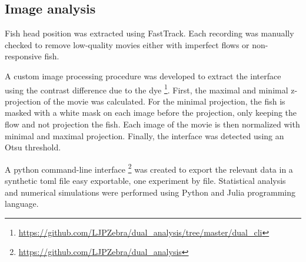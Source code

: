 \begin{appendices}
    \section{Image analysis}
     \label{auto_analysis}
    Fish head position was extracted using FastTrack. Each recording was manually checked to remove low-quality movies either with imperfect flows or non-responsive fish.

    A custom image processing procedure was developed to extract the interface using the contrast difference due to the dye \footnote{\url{https://github.com/LJPZebra/dual_analysis/tree/master/dual_cli}}. First, the maximal and minimal z-projection of the movie was calculated. For the minimal projection, the fish is masked with a white mask on each image before the projection, only keeping the flow and not projection the fish. Each image of the movie is then normalized with minimal and maximal projection. Finally, the interface was detected using an Otsu threshold.

    A python command-line interface \footnote{\url{https://github.com/LJPZebra/dual_analysis}} was created to export the relevant data in a synthetic toml file easy exportable, one experiment by file. Statistical analysis and numerical simulations were performed using Python and Julia programming language.


\end{appendices}
